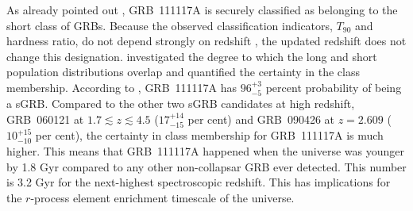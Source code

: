\documentclass{aa}    %
\newcommand\todo[1]{\textbf{(#1)}}
\begin{document}
As already pointed out \citep{Margutti2012, Sakamoto2013}, GRB~111117A is
securely classified as belonging to the short class of GRBs. Because the
observed classification indicators, $T_{90}$ and hardness ratio, do not depend
strongly on redshift \citep{Littlejohns2013a}, the updated redshift does not
change this designation.
\citet{Bromberg2013} investigated the degree to which the long and short
population distributions overlap and quantified the certainty in the class
membership. According to \citet{Bromberg2013}, GRB~111117A has $96_{-5}^{+3}$
percent probability of being a sGRB. Compared to the other two sGRB candidates
at high redshift, GRB~060121 \citep{DeUgartePostigo2006, Levan2006} at $1.7
\lesssim z \lesssim 4.5$ ($17_{-15}^{+14}$ per cent) and GRB~090426
\citep{Antonelli2009, Levesque2010, Thone2011} at $z = 2.609$ ($10_{-10}^{+15}$
per cent), the certainty in class membership for GRB~111117A is much higher.
This means that GRB~111117A happened when the universe was younger by 1.8 Gyr
compared to any other non-collapsar GRB ever detected. This number is 3.2 Gyr
for the next-highest spectroscopic redshift. This has implications for the
$r$-process element enrichment timescale of the universe.


\end{document}
